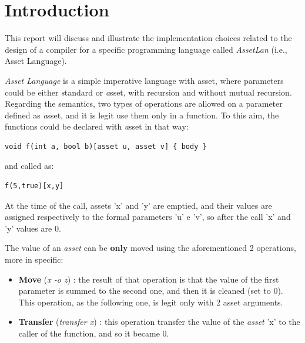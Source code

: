 \documentclass[11pt]{article} %
\begin{document}
\pagestyle{empty}
\clearpage
\tableofcontents
\thispagestyle{empty}
\newpage

\section{Introduction}
This report will discuss and illustrate the implementation choices related to the design of a compiler for a specific programming language called \emph{AssetLan} (i.e., Asset Language). 

\medskip

\emph{Asset Language} is a simple imperative language with asset, where parameters could be either {\emph standard} or {\emph asset}, with recursion and without mutual recursion. Regarding the semantics, two types of operations are allowed on a parameter defined as {\emph asset}, and it is legit use them only in a function. To this aim, the functions could be declared  with {\emph asset} in that way:\begin{verbatim}
void f(int a, bool b)[asset u, asset v] { body }
\end{verbatim} 
and called as: 
\begin{verbatim}
f(5,true)[x,y]
\end{verbatim}
At the time of the call, assets 'x' and 'y' are emptied, and their values are assigned respectively to the formal parameters 'u' e 'v', so after the call 'x' and 'y' values are 0.

\medskip

The value of an \emph{asset} can be \textbf{only} moved using the aforementioned 2 operations, more in specific: 
\begin{itemize}
\item \textbf{Move} (\emph{x -o z}) : the result of that operation is that the value of the first parameter is summed to the second one, and then it is cleaned (set to 0). This operation, as the following one, is legit only with 2 asset arguments.
\item \textbf{Transfer} (\emph{transfer x}) : this operation transfer the value of the \emph{asset} 'x' to the caller of the function, and so it became 0.
\end{itemize}
\end{document}
